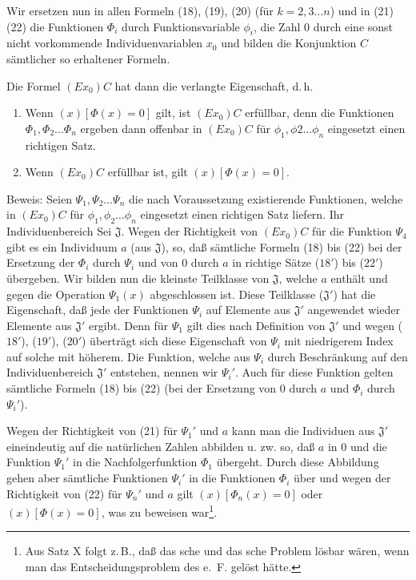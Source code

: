 \documentclass[draft]{scrartcl}
\begin{document}
Wir ersetzen nun in allen Formeln (18), (19), (20) (für $k = 2, 3 \dots n$) und in (21) (22) die Funktionen $\Phi_i$ durch Funktionsvariable
$\phi_i$, die Zahl $0$ durch eine sonst nicht vorkommende
Individuenvariablen $x_0$ und bilden die Konjunktion $C$ sämtlicher so erhaltener Formeln.

Die Formel $\left(Ex_0\right) C$ hat dann die verlangte Eigenschaft, d.\,h.

\begin{enumerate}
	\item Wenn $\left(x\right)\left[\Phi\left(x\right) = 0\right]$ gilt, ist $\left(Ex_0\right)C$ erfüllbar, denn die Funktionen $\Phi_1, \Phi_2 \dots \Phi_n$ ergeben dann offenbar in $\left(Ex_0\right)C$ für $\phi_1, \phi2 \dots \phi_n$ eingesetzt einen richtigen Satz.
	\item Wenn $\left(Ex_0\right)C$ erfüllbar ist, gilt $\left(x\right)\left[\Phi\left(x\right) = 0\right]$.
\end{enumerate}

Beweis: Seien $\Psi_1, \Psi_2 \dots \Psi_n$ die nach Voraussetzung
existierende Funktionen, welche in $\left(Ex_0\right)C$ für
$\phi_1, \phi_2 \dots \phi_n$ eingesetzt einen richtigen Satz liefern.
Ihr Individuenbereich Sei $\mathfrak{J}$. Wegen der Richtigkeit von
$\left(Ex_0\right)C$ für die Funktion $\Psi_4$ gibt es ein Individuum $a$
(aus $\mathfrak{J}$), so, daß sämtliche Formeln (18) bis (22)
bei der Ersetzung der $\Phi_i$ durch $\Psi_i$ und von 0 durch $a$
in richtige Sätze ($18'$) bis ($22'$) übergeben. Wir bilden nun
die kleinste Teilklasse von $\mathfrak{J}$, welche $a$ enthält
und gegen die Operation $\Psi_1\left(x\right)$ abgeschlossen ist.
Diese Teilklasse ($\mathfrak{J}'$) hat die Eigenschaft, daß
jede der Funktionen $\Psi_i$ auf Elemente aus $\mathfrak{J}'$
angewendet wieder Elemente aus $\mathfrak{J}'$ ergibt.
Denn für $\Psi_1$ gilt dies nach Definition von $\mathfrak{J}'$
und wegen ($18'$), ($19'$), ($20'$) überträgt sich diese
Eigenschaft von $\Psi_i$ mit niedrigerem Index auf solche mit höherem.
Die Funktion, welche aus $\Psi_i$ durch Beschränkung auf den
Individuenbereich $\mathfrak{J}'$ entstehen, nennen wir
$\Psi_i'$. Auch für diese Funktion gelten sämtliche Formeln
(18) bis (22) (bei der  Ersetzung von 0 durch $a$ und $\Phi_i$ durch $\Psi_i'$).

Wegen der Richtigkeit von (21) für $\Psi_1'$ und $a$ kann man die Individuen aus $\mathfrak{J}'$ eineindeutig auf die natürlichen Zahlen abbilden u. zw. so, daß $a$ in $0$ und die Funktion $\Psi_1'$ in die Nachfolgerfunktion $\Phi_1$ übergeht. Durch diese Abbildung gehen aber sämtliche Funktionen $\Psi_i'$ in die Funktionen $\Phi_i$ über und wegen der Richtigkeit von (22) für $\Psi_n'$ und $a$ gilt $\left(x\right)\left[\Phi_n\left(x\right) = 0\right]$ oder $\left(x\right)\left[\Phi\left(x\right) = 0\right]$, was zu beweisen war\footnote{Aus Satz X folgt z.\,B., daß das sche und das sche Problem lösbar wären, wenn man das Entscheidungsproblem des e.~F. gelöst hätte.}.
\end{document}
